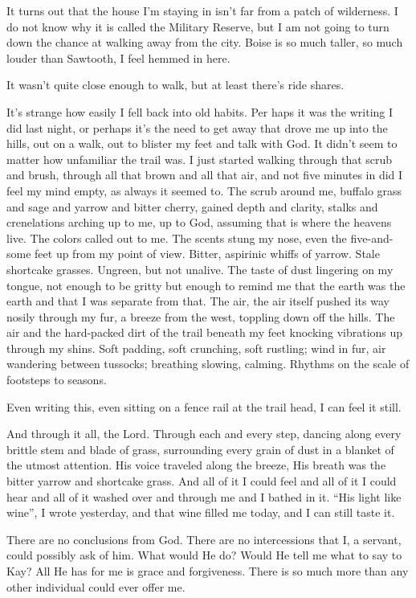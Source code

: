 It turns out that the house I'm staying in isn't far from a patch of wilderness. I do not know why it is called the Military Reserve, but I am not going to turn down the chance at walking away from the city. Boise is so much taller, so much louder than Sawtooth, I feel hemmed in here.

It wasn't quite close enough to walk, but at least there's ride shares.

It's strange how easily I fell back into old habits. Per haps it was the writing I did last night, or perhaps it's the need to get away that drove me up into the hills, out on a walk, out to blister my feet and talk with God. It didn't seem to matter how unfamiliar the trail was. I just started walking through that scrub and brush, through all that brown and all that air, and not five minutes in did I feel my mind empty, as always it seemed to. The scrub around me, buffalo grass and sage and yarrow and bitter cherry, gained depth and clarity, stalks and crenelations arching up to me, up to God, assuming that is where the heavens live. The colors called out to me. The scents stung my nose, even the five-and-some feet up from my point of view. Bitter, aspirinic whiffs of yarrow. Stale shortcake grasses. Ungreen, but not unalive. The taste of dust lingering on my tongue, not enough to be gritty but enough to remind me that the earth was the earth and that I was separate from that. The air, the air itself pushed its way nosily through my fur, a breeze from the west, toppling down off the hills. The air and the hard-packed dirt of the trail beneath my feet knocking vibrations up through my shins. Soft padding, soft crunching, soft rustling; wind in fur, air wandering between tussocks; breathing slowing, calming. Rhythms on the scale of footsteps to seasons.

Even writing this, even sitting on a fence rail at the trail head, I can feel it still.

And through it all, the Lord. Through each and every step, dancing along every brittle stem and blade of grass, surrounding every grain of dust in a blanket of the utmost attention. His voice traveled along the breeze, His breath was the bitter yarrow and shortcake grass. And all of it I could feel and all of it I could hear and all of it washed over and through me and I bathed in it. ``His light like wine'', I wrote yesterday, and that wine filled me today, and I can still taste it.

There are no conclusions from God. There are no intercessions that I, a servant, could possibly ask of him. What would He do? Would He tell me what to say to Kay? All He has for me is grace and forgiveness. There is so much more than any other individual could ever offer me.

